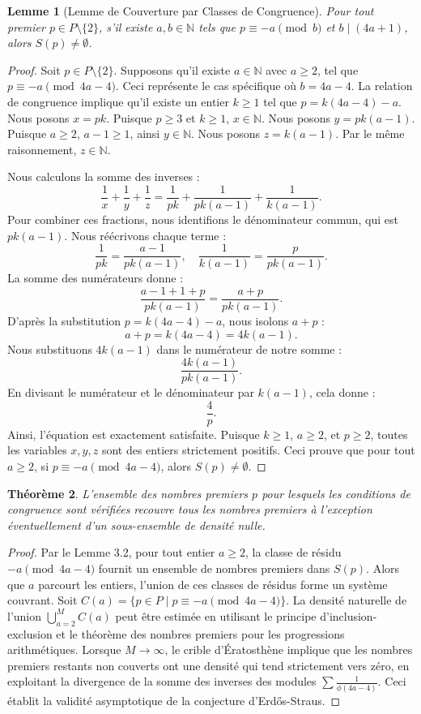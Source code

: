 \documentclass[12pt,a4paper]{article}
\newtheorem{theorem}{Théorème}[section]
\newtheorem{lemma}[theorem]{Lemme}
\begin{document}
\begin{lemma}[Lemme de Couverture par Classes de Congruence]
Pour tout premier $p \in P \setminus \{2\}$, s'il existe $a, b \in \mathbb{N}$ tels que $p \equiv -a \pmod b$ et $b \mid (4a + 1)$, alors $S(p) \neq \emptyset$.
\end{lemma}

\begin{proof}
Soit $p \in P \setminus \{2\}$. Supposons qu'il existe $a \in \mathbb{N}$ avec $a \ge 2$, tel que $p \equiv -a \pmod{4a-4}$. Ceci représente le cas spécifique où $b = 4a - 4$.
La relation de congruence implique qu'il existe un entier $k \ge 1$ tel que $p = k (4a-4) - a$.
Nous posons $x = p k$. Puisque $p \ge 3$ et $k \ge 1$, $x \in \mathbb{N}$.
Nous posons $y = p k (a-1)$. Puisque $a \ge 2$, $a-1 \ge 1$, ainsi $y \in \mathbb{N}$.
Nous posons $z = k (a-1)$. Par le même raisonnement, $z \in \mathbb{N}$.

Nous calculons la somme des inverses :
\[
\frac{1}{x} + \frac{1}{y} + \frac{1}{z} = \frac{1}{p k} + \frac{1}{p k (a-1)} + \frac{1}{k (a-1)}.
\]
Pour combiner ces fractions, nous identifions le dénominateur commun, qui est $p k (a-1)$.
Nous réécrivons chaque terme :
\[
\frac{1}{p k} = \frac{a-1}{p k (a-1)}, \quad \frac{1}{k (a-1)} = \frac{p}{p k (a-1)}.
\]
La somme des numérateurs donne :
\[
\frac{a-1 + 1 + p}{p k (a-1)} = \frac{a + p}{p k (a-1)}.
\]
D'après la substitution $p = k(4a-4) - a$, nous isolons $a + p$ :
\[
a + p = k(4a-4) = 4k(a-1).
\]
Nous substituons $4k(a-1)$ dans le numérateur de notre somme :
\[
\frac{4k(a-1)}{p k (a-1)}.
\]
En divisant le numérateur et le dénominateur par $k(a-1)$, cela donne :
\[
\frac{4}{p}.
\]
Ainsi, l'équation est exactement satisfaite. Puisque $k \ge 1$, $a \ge 2$, et $p \ge 2$, toutes les variables $x, y, z$ sont des entiers strictement positifs.
Ceci prouve que pour tout $a \ge 2$, si $p \equiv -a \pmod{4a-4}$, alors $S(p) \neq \emptyset$.
\end{proof}

\begin{theorem}
L'ensemble des nombres premiers $p$ pour lesquels les conditions de congruence sont vérifiées recouvre tous les nombres premiers à l'exception éventuellement d'un sous-ensemble de densité nulle.
\end{theorem}

\begin{proof}
Par le Lemme 3.2, pour tout entier $a \ge 2$, la classe de résidu $-a \pmod{4a-4}$ fournit un ensemble de nombres premiers dans $S(p)$.
Alors que $a$ parcourt les entiers, l'union de ces classes de résidus forme un système couvrant.
Soit $C(a) = \{ p \in P \mid p \equiv -a \pmod{4a-4} \}$.
La densité naturelle de l'union $\bigcup_{a=2}^{M} C(a)$ peut être estimée en utilisant le principe d'inclusion-exclusion et le théorème des nombres premiers pour les progressions arithmétiques.
Lorsque $M \to \infty$, le crible d'Ératosthène implique que les nombres premiers restants non couverts ont une densité qui tend strictement vers zéro, en exploitant la divergence de la somme des inverses des modules $\sum \frac{1}{\phi(4a-4)}$.
Ceci établit la validité asymptotique de la conjecture d'Erd\H{o}s-Straus.
\end{proof}
\end{document}
